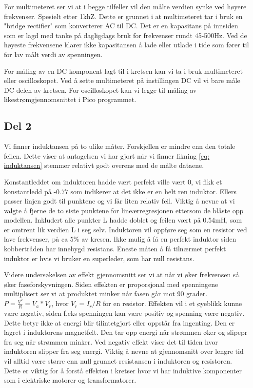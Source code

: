 \documentclass[norsk,a4paper,12pt]{article}
\begin{document}
For multimeteret ser vi at i begge tilfeller vil den målte verdien synke ved høyere frekvenser. Spesielt etter 1khZ. Dette er grunnet i at multimeteret tar i bruk en "bridge rectifier" som konverterer AC til DC. Det er en kapasitans på innsiden som er lagd med tanke på dagligdags bruk for frekvenser rundt 45-500Hz. Ved de høyeste frekvensene klarer ikke kapasitansen å lade eller utlade i tide som fører til for lav målt verdi av spenningen.

For måling av en DC-komponent lagt til i kretsen kan vi ta i bruk multimeteret eller oscilloskopet. Ved å sette multimeteret på instillingen DC vil vi bare måle DC-delen av kretsen. For oscilloskopet kan vi legge til måling av likestrømgjennomsnittet i Pico programmet.


\subsection{Del 2}
Vi finner induktansen på to ulike måter. Forskjellen er mindre enn den totale feilen. Dette viser at antagelsen vi har gjort når vi finner likning \ref{eq: induktansen} stemmer relativt godt overens med de målte dataene.

Konstantleddet om induktoren hadde vært perfekt ville vært 0, vi fikk et konstantledd på -0.77 som indikerer at det ikke er en helt ren induktor. Ellers passer linjen godt til punktene og vi får liten relativ feil. Viktig å nevne at vi valgte å fjerne de to siste punktene for lineærregresjonen ettersom de blåste opp modellen. Inkludert alle punkter  L hadde doblet og feilen vært på 0.54mH, som er omtrent lik verdien L i seg selv. Induktoren vil oppføre seg som en resistor ved lave frekvenser, på ca 5\% av kresen. Ikke mulig å få en perfekt induktor siden kobbertråden har innebygd resistans. Eneste måten å få tilnærmet perfekt induktor er hvis vi bruker en superleder, som har null resistans.

Videre undersøkelsen av effekt gjennomsnitt ser vi at når vi øker frekvensen så øker faseforskyvningen. Siden effekten er proporsjonal med spenningene multiplisert ser vi at produktet minker når fasen går mot 90 grader. $P = \frac{V^2}{R} = V_a * V_r$, hvor $V_r = I_r/R$ for en resistor. Effekten vil i et øyeblikk kunne være negativ, siden f.eks spenningen kan være positiv og spenning være negativ. Dette betyr ikke at energi blir tilintetgjort eller oppstår fra ingenting. Den er lagret i induktorens magnetfelt. Den tar opp energi når strømmen øker og slipepr fra seg når strømmen minker. Ved negativ effekt viser det til tiden hvor induktoren slipper fra seg energi. Viktig å nevne at gjennomsnitt over lengre tid vil alltid være større enn null grunnet resistansen i induktoren og resistoren. Dette er viktig for å forstå effekten i kretser hvor vi har induktive komponenter som i elektriske motorer og transformatorer. 
\end{document}
